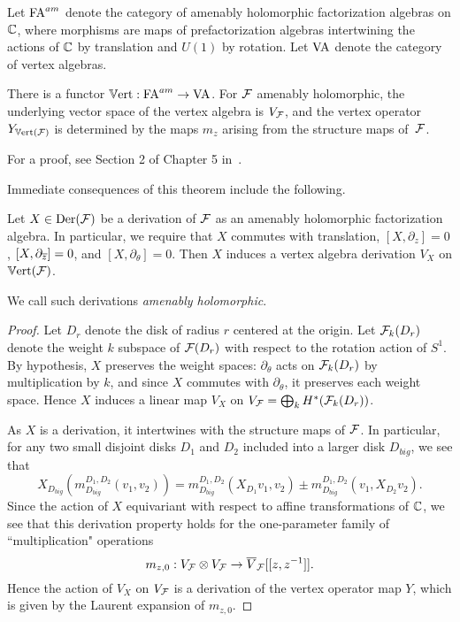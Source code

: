 Let ${\rm FA}^{am}$ denote the category of amenably holomorphic factorization algebras on $\mathbb C$,
where morphisms are maps of prefactorization algebras intertwining the actions of $\mathbb C$ by translation and $U(1)$ by rotation.
Let ${\rm VA}$ denote the category of vertex algebras.

\begin{thm}
\label{theorem_vertex_algebra}
There is a functor $\mathbb{V}{\rm ert}:{\rm FA}^{am} \to {\rm VA}$. 
For $\mathcal F$ amenably holomorphic, the underlying vector space of the vertex algebra is $V_\mathcal F$,
and the vertex operator $Y_{\mathbb{V}{\rm ert}(\mathcal F)}$ is determined by the maps $m_z$ arising from the structure maps of~$\mathcal F$.
\end{thm}

For a proof, see Section 2 of Chapter 5 in~\cite{CG1}.  

Immediate consequences of this theorem include the following.

\begin{lemma}\label{factder}
Let $X \in {\rm Der}(\mathcal F)$ be a derivation of $\mathcal F$ as an amenably holomorphic factorization algebra. In particular, we require that $X$ commutes with translation, $[X, \partial_z] = 0$, $[X, \partial_{\overline{z}}] = 0$, and $[X, \partial_\theta] = 0$. Then $X$ induces a vertex algebra derivation $V_X$ on $\mathbb{V}{\rm ert}(\mathcal F)$.
\end{lemma}

We call such derivations {\em amenably holomorphic}.

\begin{proof}
Let $D_r$ denote the disk of radius $r$ centered at the origin. 
Let $\mathcal F_k(D_r)$ denote the weight $k$ subspace of $\mathcal F(D_r)$ with respect to the rotation action of $S^1$. 
By hypothesis, $X$ preserves the weight spaces: $\partial_\theta$ acts on $\mathcal F_k(D_r)$ by multiplication by $k$, 
and since $X$ commutes with $\partial_\theta$, it preserves each weight space. 
Hence $X$ induces a linear map $V_X$ on $V_\mathcal F = \bigoplus_k H^*(\mathcal F_k(D_r))$. 

As $X$ is a derivation, it intertwines with the structure maps of $\mathcal F$. In particular, for any two small disjoint disks $D_1$ and $D_2$ included into a larger disk $D_{big}$, we see that 
\[
X_{D_{big}}(m^{D_1,D_2}_{D_{big}}(v_1, v_2)) = m^{D_1,D_2}_{D_{big}}(X_{D_1} v_1, v_2) \pm m^{D_1,D_2}_{D_{big}}(v_1, X_{D_2} v_2).
\]
Since the action of $X$ equivariant with respect to affine transformations of $\mathbb C$, we see that this derivation property holds for the one-parameter family of ``multiplication" operations 
\[
m_{z,0}: V_\mathcal F \otimes V_\mathcal F \to \overline{V}_\mathcal F[[z,z^{-1}]].
\]
Hence the action of $V_X$ on $V_\mathcal F$ is a derivation of the vertex operator map $Y$, which is given by the Laurent expansion of $m_{z,0}$. 
\end{proof}

